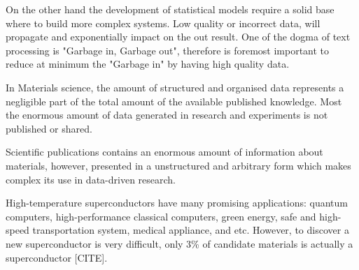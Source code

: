 \documentclass[a4paper,10pt]{article}
\begin{document}
On the other hand the development of statistical models require a solid base where to build more complex systems. Low quality or incorrect data, will propagate and exponentially impact on the out result. One of the dogma of text processing is "Garbage in, Garbage out", therefore is foremost important to reduce at minimum the "Garbage in" by having high quality data. 



In Materials science, the amount of structured and organised data represents a negligible part of the total amount of the available published knowledge. Most the enormous amount of data generated in research and experiments is not published or shared. 




Scientific publications contains an enormous amount of information about materials, however, presented in a unstructured and arbitrary form which makes complex its use in data-driven research. 




High-temperature superconductors have many promising applications: quantum computers, high-performance classical computers, green energy, safe and high-speed transportation system, medical appliance, and etc. However, to discover a new superconductor is very difficult, only 3\% of candidate materials is actually a superconductor [CITE]. 
\end{document}
